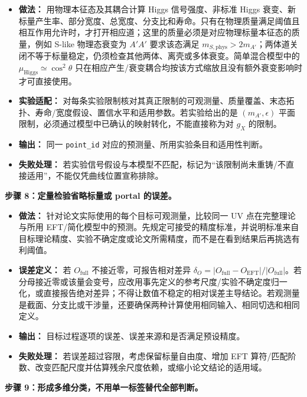 \documentclass[
]{article}
\providecommand{\tightlist}{%
  \setlength{\itemsep}{0pt}\setlength{\parskip}{0pt}}
\begin{document}
\begin{itemize}
\tightlist
\item
  \textbf{做法：} 用物理本征态及其耦合计算 Higgs 信号强度、非标准 Higgs
  衰变、新标量产生率、部分宽度、总宽度、分支比和寿命。只有在物理质量满足阈值且相互作用允许时，才打开相应道；这里的质量必须是对应物理标量本征态的质量，例如
  S-like 物理态衰变为 \(A'A'\) 要求该态满足
  \(m_{S,\mathrm{phys}}>2m_{A'}\)；两体道关闭不等于标量稳定，仍须检查其他两体、离壳或多体衰变。简单混合模型中的
  \(\mu_{\mathrm{Higgs}}\simeq\cos^2\theta\)
  只在相应产生/衰变耦合均按该方式缩放且没有额外衰变影响时才可直接使用。
\item
  \textbf{实验适配：}
  对每条实验限制核对其真正限制的可观测量、质量覆盖、末态拓扑、寿命/宽度假设、置信水平和适用参数。若实验给出的是
  \((m_{A'},\epsilon)\)
  平面限制，必须通过模型中已确认的映射转化，不能直接称为对 \(g_X\)
  的限制。
\item
  \textbf{输出：} 同一 \texttt{point\_id}
  对应的预测量、所用实验条目和适用性判断。
\item
  \textbf{失败处理：}
  若实验信号假设与本模型不匹配，标记为``该限制尚未重铸/不直接适用''，不能仅凭曲线位置宣称排除。
\end{itemize}

\textbf{步骤 8：定量检验省略标量或 portal 的误差。}

\begin{itemize}
\tightlist
\item
  \textbf{做法：} 针对论文实际使用的每个目标可观测量，比较同一 UV
  点在完整理论与所用
  EFT/简化模型中的预测。先规定可接受的精度标准，并说明标准来自目标理论精度、实验不确定度或论文所需精度，而不是在看到结果后再挑选有利阈值。
\item
  \textbf{误差定义：} 若 \(O_{\mathrm{full}}\) 不接近零，可报告相对差异
  \(\delta_O=|O_{\mathrm{full}}-O_{\mathrm{EFT}}|/|O_{\mathrm{full}}|\)。若分母接近零或该量会变号，应改用事先定义的参考尺度/实验不确定度归一化，或直接报告绝对差异；不得让数值不稳定的相对误差主导结论。若观测量是截面、分支比或干涉量，还要确保两种计算使用相同输入、相同切选和相同定义。
\item
  \textbf{输出：} 目标过程逐项的误差、误差来源和是否满足预设精度。
\item
  \textbf{失败处理：} 若误差超过容限，考虑保留标量自由度、增加 EFT
  算符/匹配阶数、改变匹配尺度并估算残余尺度依赖，或缩小论文结论的适用域。
\end{itemize}

\textbf{步骤 9：形成多维分类，不用单一标签替代全部判断。}
\end{document}

